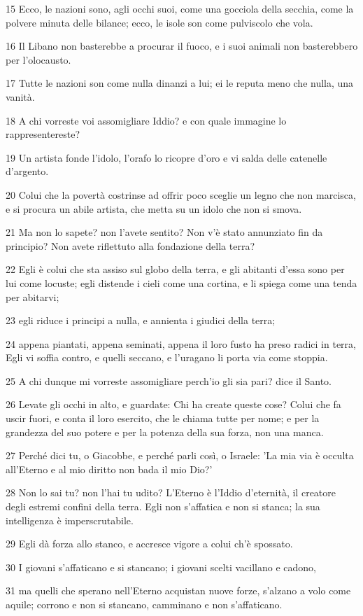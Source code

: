 \par 15 Ecco, le nazioni sono, agli occhi suoi, come una gocciola della secchia, come la polvere minuta delle bilance; ecco, le isole son come pulviscolo che vola.
\par 16 Il Libano non basterebbe a procurar il fuoco, e i suoi animali non basterebbero per l'olocausto.
\par 17 Tutte le nazioni son come nulla dinanzi a lui; ei le reputa meno che nulla, una vanità.
\par 18 A chi vorreste voi assomigliare Iddio? e con quale immagine lo rappresentereste?
\par 19 Un artista fonde l'idolo, l'orafo lo ricopre d'oro e vi salda delle catenelle d'argento.
\par 20 Colui che la povertà costrinse ad offrir poco sceglie un legno che non marcisca, e si procura un abile artista, che metta su un idolo che non si smova.
\par 21 Ma non lo sapete? non l'avete sentito? Non v'è stato annunziato fin da principio? Non avete riflettuto alla fondazione della terra?
\par 22 Egli è colui che sta assiso sul globo della terra, e gli abitanti d'essa sono per lui come locuste; egli distende i cieli come una cortina, e li spiega come una tenda per abitarvi;
\par 23 egli riduce i principi a nulla, e annienta i giudici della terra;
\par 24 appena piantati, appena seminati, appena il loro fusto ha preso radici in terra, Egli vi soffia contro, e quelli seccano, e l'uragano li porta via come stoppia.
\par 25 A chi dunque mi vorreste assomigliare perch'io gli sia pari? dice il Santo.
\par 26 Levate gli occhi in alto, e guardate: Chi ha create queste cose? Colui che fa uscir fuori, e conta il loro esercito, che le chiama tutte per nome; e per la grandezza del suo potere e per la potenza della sua forza, non una manca.
\par 27 Perché dici tu, o Giacobbe, e perché parli così, o Israele: 'La mia via è occulta all'Eterno e al mio diritto non bada il mio Dio?'
\par 28 Non lo sai tu? non l'hai tu udito? L'Eterno è l'Iddio d'eternità, il creatore degli estremi confini della terra. Egli non s'affatica e non si stanca; la sua intelligenza è imperscrutabile.
\par 29 Egli dà forza allo stanco, e accresce vigore a colui ch'è spossato.
\par 30 I giovani s'affaticano e si stancano; i giovani scelti vacillano e cadono,
\par 31 ma quelli che sperano nell'Eterno acquistan nuove forze, s'alzano a volo come aquile; corrono e non si stancano, camminano e non s'affaticano.

